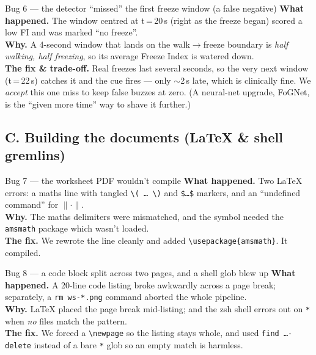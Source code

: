 \documentclass[11pt]{article}
\begin{document}
\begin{fixcard}{Bug 6 --- the detector ``missed'' the first freeze window (a false negative)}
\textbf{What happened.} The window centred at t\,=\,20\,s (right as the freeze
began) scored a low FI and was marked ``no freeze''. \\
\textbf{Why.} A 4-second window that lands on the walk$\to$freeze boundary is
\emph{half walking, half freezing}, so its average Freeze Index is watered down. \\
\textbf{The fix \& trade-off.} Real freezes last several seconds, so the very next
window (t\,=\,22\,s) catches it and the cue fires --- only $\sim$2\,s late, which is
clinically fine. We \emph{accept} this one miss to keep false buzzes at zero. (A
neural-net upgrade, FoGNet, is the ``given more time'' way to shave it further.)
\end{fixcard}

\subsection*{C. Building the documents (LaTeX \& shell gremlins)}

\begin{fixcard}{Bug 7 --- the worksheet PDF wouldn't compile}
\textbf{What happened.} Two LaTeX errors: a maths line with tangled
\texttt{\textbackslash(\,\dots\,\textbackslash)} and \texttt{\$\dots\$} markers,
and an ``undefined command'' for $\lVert\cdot\rVert$. \\
\textbf{Why.} The maths delimiters were mismatched, and the symbol needed the
\texttt{amsmath} package which wasn't loaded. \\
\textbf{The fix.} We rewrote the line cleanly and added
\texttt{\textbackslash usepackage\{amsmath\}}. It compiled.
\end{fixcard}

\begin{fixcard}{Bug 8 --- a code block split across two pages, and a shell glob blew up}
\textbf{What happened.} A 20-line code listing broke awkwardly across a page
break; separately, a \texttt{rm ws-*.png} command aborted the whole pipeline. \\
\textbf{Why.} LaTeX placed the page break mid-listing; and the zsh shell errors
out on \texttt{*} when \emph{no} files match the pattern. \\
\textbf{The fix.} We forced a \texttt{\textbackslash newpage} so the listing
stays whole, and used \texttt{find \dots -delete} instead of a bare \texttt{*}
glob so an empty match is harmless.
\end{fixcard}
\end{document}
